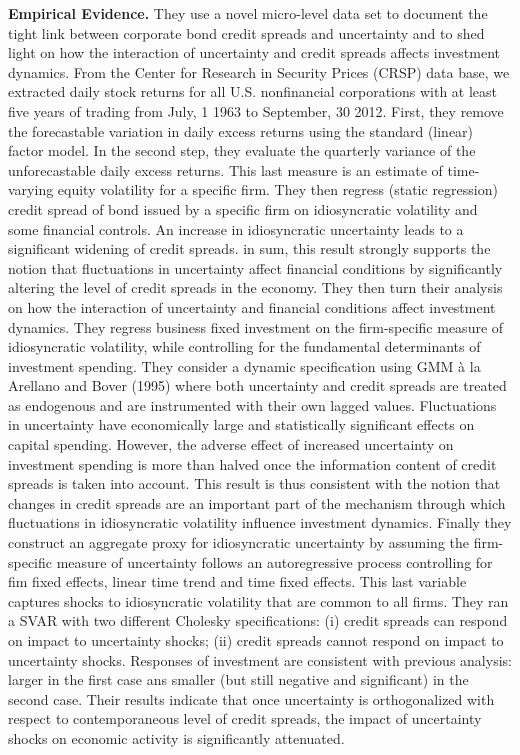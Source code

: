 \documentclass{article}
\begin{document}
{\textbf{Empirical Evidence.} They use a novel micro-level data set to document the tight link between corporate bond credit spreads and uncertainty and to shed light on how the interaction of uncertainty and credit spreads affects investment dynamics. From the Center for Research in Security Prices (CRSP) data base, we extracted daily stock returns for all U.S. nonfinancial corporations with at least five years of trading from July, 1 1963 to September, 30 2012. First, they remove the forecastable variation in daily excess returns using the standard (linear) factor model. In the second step, they evaluate the quarterly variance of the unforecastable daily excess returns. This last measure is an estimate of time-varying equity volatility for a specific firm. They then regress (static regression) credit spread of bond issued by a specific firm on idiosyncratic volatility and some financial controls. An increase in idiosyncratic uncertainty leads to a significant widening of credit spreads. in sum, this result strongly supports the notion that fluctuations in uncertainty affect financial conditions by significantly altering the level of credit spreads in the economy. They then turn their analysis on how the interaction of uncertainty and financial conditions affect investment dynamics. They regress business fixed investment on the firm-specific measure of idiosyncratic volatility, while controlling for the fundamental determinants of investment spending. They consider a dynamic specification using GMM \`a la Arellano and Bover (1995) where both uncertainty and credit spreads are treated as endogenous and are instrumented with their own lagged values. Fluctuations in uncertainty have economically large and statistically significant effects on capital spending. However, the adverse effect of increased uncertainty on investment spending is more than halved once the information content of credit spreads is taken into account. This result is thus consistent with the notion that changes in credit spreads are an important part of the mechanism through which fluctuations in idiosyncratic volatility influence investment dynamics. Finally they construct an aggregate proxy for idiosyncratic uncertainty by assuming the firm-specific measure of uncertainty follows an autoregressive process controlling for fim fixed effects, linear time trend and time fixed effects. This last variable captures shocks to idiosyncratic volatility that are common to all firms. They ran a SVAR with two different Cholesky specifications: (i) credit spreads can respond on impact to uncertainty shocks; (ii) credit spreads cannot respond on impact to uncertainty shocks. Responses of investment are consistent with previous analysis: larger in the first case ans smaller (but still negative and significant) in the second case. Their results indicate that once uncertainty is orthogonalized with respect to contemporaneous level of credit spreads, the impact of uncertainty shocks on economic activity is significantly attenuated. 

}
\end{document}
